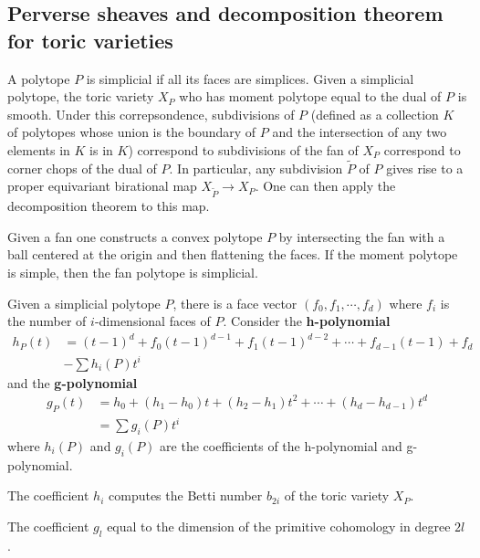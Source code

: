 \documentclass[12pt]{article}
\begin{document}
\subsection{Perverse sheaves and decomposition theorem for toric varieties}
A polytope $P$ is simplicial if all its faces are simplices. Given
a simplicial polytope, the toric variety $X_P$ who has moment polytope equal to 
the dual of $P$ is smooth. Under this correpsondence, subdivisions of $P$ (defined as
a collection $K$ of polytopes whose union is the boundary of $P$ and the intersection of
any two elements in $K$ is in $K$) 
correspond to subdivisions of the fan of $X_P$ correspond to corner chops of the dual of $P$. In 
particular, any subdivision $\tilde P$ of $P$ gives rise to a proper equivariant 
birational map $X_{\tilde P} \to X_P$. One can then apply the 
decomposition theorem to this map.

\hfill 

Given a fan one constructs a convex polytope $P$ by intersecting the fan with a 
ball centered at the origin and then flattening the faces. If the 
moment polytope is simple, then the fan polytope is simplicial.

\begin{definition}
    Given a simplicial polytope $P$, there is a face vector $(f_0,f_1,\cdots,f_d)$
    where $f_i$ is the number of $i$-dimensional faces of $P$. Consider the 
    \textbf{h-polynomial} \begin{align*}
        h_P(t) &= (t-1)^d + f_0(t-1)^{d-1} + f_1(t-1)^{d-2} + \cdots + f_{d-1}(t-1) + f_d \\
        &- \sum h_i(P) t^i
    \end{align*} 
    and the \textbf{g-polynomial} \begin{align*}
        g_P(t) &= h_0 + (h_1 - h_0)t + (h_2 - h_1)t^2 + \cdots + (h_d - h_{d-1})t^d \\
        &= \sum g_i(P)t^i
    \end{align*} where $h_i(P)$ and $g_i(P)$ are the coefficients of the h-polynomial and g-polynomial.
\end{definition}

\begin{proposition}
    The coefficient $h_i$ computes the Betti number $b_{2i}$ of the toric variety $X_P$.
\end{proposition}

\begin{proposition}
    The coefficient $g_l$ equal to the dimension of 
    the primitive cohomology in degree $2l$.
\end{proposition}
\end{document}
